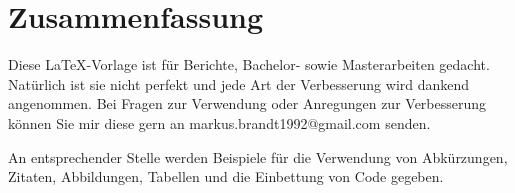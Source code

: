 \chapter*{Zusammenfassung}

Diese \LaTeX-Vorlage ist für Berichte, Bachelor- sowie Masterarbeiten gedacht. Natürlich ist sie nicht perfekt und jede Art der Verbesserung wird dankend angenommen. Bei Fragen zur Verwendung oder Anregungen zur Verbesserung können Sie mir diese gern an markus.brandt1992@gmail.com senden.

An entsprechender Stelle werden Beispiele für die Verwendung von Abkürzungen, Zitaten, Abbildungen, Tabellen und die Einbettung von Code gegeben.

